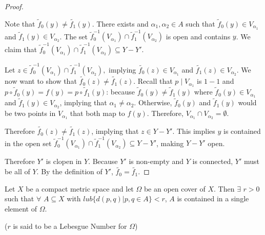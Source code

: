 \begin{proof}
\begin{itemize}
Note that $\widetilde{f}_0(y)\ne\widetilde{f_1}(y)$. There exists and $\alpha_1,\alpha_2\in A$ such that $\widetilde{f}_0(y)\in V_{\alpha_1}$ and $\widetilde{f}_1(y)\in V_{\alpha_2}$. The set $\widetilde{f}_0^{-1}(V_{\alpha_1})\cap\widetilde{f}_1^{-1}(V_{\alpha_2})$ is open and contains $y$. We claim that $\widetilde{f}_0^{-1}(V_{\alpha_1})\cap\widetilde{f}_1^{-1}(V_{\alpha_2})\subseteq Y-Y'$.

Let $z\in \widetilde{f}_0^{-1}(V_{\alpha_1})\cap\widetilde{f}_1^{-1}(V_{\alpha_2}),$ implying $\widetilde{f_0}(z)\in V_{\alpha_1}$ and $\widetilde{f_1}(z)\in V_{\alpha_2}$. We now want to show that $\widetilde{f_0}(z)\ne\widetilde{f_1}(z)$. Recall that $p\mid V_{\alpha_1}$ is $1-1$ and $p\circ\widetilde{f}_0(y)=f(y)=p\circ\widetilde{f}_1(y)$: because $\widetilde{f}_0(y)\ne\widetilde{f}_1(y)$ where $\widetilde{f}_0(y)\in V_{\alpha_1}$ and $\widetilde{f}_1(y)\in V_{\alpha_2}$, implying that $\alpha_1\ne \alpha_2$. Otherwise, $\widetilde{f}_0(y)$ and $\widetilde{f}_1(y)$ would be two points in $V_{\alpha_1}$ that both map to $f(y)$. Therefore, $V_{\alpha_1}\cap V_{\alpha_2}=\emptyset$.

Therefore $\widetilde{f_0}(z)\ne\widetilde{f_1}(z)$, implying that $z\in Y-Y'$. This implies $y$ is contained in the open set $\widetilde{f}_0^{-1}(V_{\alpha_1})\cap\widetilde{f}_1^{-1}(V_{\alpha_2})\subseteq Y-Y'$, making $Y-Y'$ open. 
\end{itemize}
Therefore $Y'$ is clopen in $Y$. Because $Y'$ is non-empty and $Y$ is connected, $Y'$ must be all of $Y$. By the definition of $Y'$, $\widetilde{f_0}=\widetilde{f_1}$.
\end{proof}


    \begin{lemma}
    Let $X$ be a compact metric space and let $\Omega$ be an open cover of $X$. Then $\exists$ $r > 0$ such that $\forall$ $A \subseteq X$ with $lub \{ d(p,q)|p, q \in A \} < r$, $A$ is contained in a single element of $\Omega$.
    
    ($r$ is said to be a Lebesgue Number for $\Omega$)
    \end{lemma}
    
